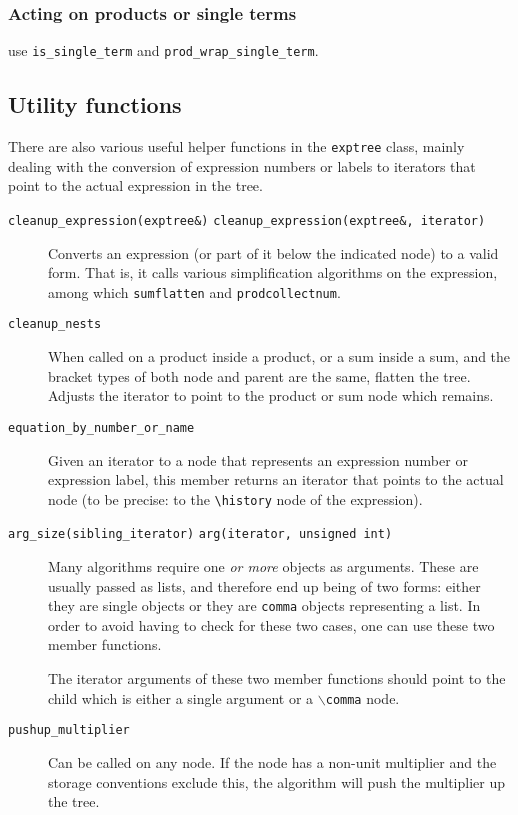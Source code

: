 \documentclass[11pt]{article}
\newcommand{\member}[1]{{\tt #1}}
\newcommand{\texcommand}[1]{{\tt $\backslash$#1}}
\numberwithin{equation}{section}
\begin{document}
\subsubsection{Acting on products or single terms}

use \member{is\_single\_term} and \member{prod\_wrap\_single\_term}.


\subsection{Utility functions}

\label{s:utility}
There are also various useful helper functions in the {\tt exptree} 
class, mainly dealing with the conversion of expression numbers or
labels to iterators that point to the actual expression in the tree.
\begin{description}
\item[\vbox{\hbox{\member{cleanup\_expression(exptree\&)}}
            \hbox{\member{cleanup\_expression(exptree\&, iterator)}}}]
Converts an expression (or part of it below the indicated node) to
a valid form. That is, it calls various simplification algorithms
on the expression, among which {\tt sumflatten} and {\tt prodcollectnum}. 

\item[\member{cleanup\_nests}] When called on a product inside a
  product, or a sum inside a sum, and the bracket types of both node
  and parent are the same, flatten the tree. Adjusts the iterator to
  point to the product or sum node which remains.

\item[\member{equation\_by\_number\_or\_name}] Given an iterator
to a node that represents an expression number or expression label,
this member returns an iterator that points to the actual node
(to be precise: to the \verb|\history| node of the expression).

\item[\vbox{\hbox{\member{arg\_size(sibling\_iterator)}}
      \hbox{\member{arg(iterator, unsigned int)}}}]
Many algorithms require one \emph{or more} objects as arguments. These
are usually passed as lists, and therefore end up being of two forms:
either they are single objects or they are {\tt comma} objects
representing a list. In order to avoid having to check for these two
cases, one can use these two member functions.

The iterator arguments of these two member functions should point to
the child which is either a single argument or a \texcommand{comma}
node.

\item[\member{pushup\_multiplier}] Can be called on any node. If the
  node has a non-unit multiplier and the storage conventions exclude
  this, the algorithm will push the multiplier up the tree.
\end{description}
\end{document}

